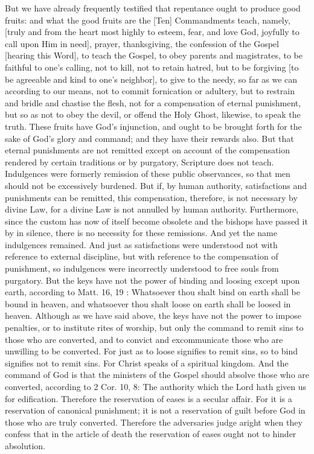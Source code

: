 But we have already frequently testified that repentance ought to
produce good fruits: and what the good fruits are the [Ten]
Commandments teach, namely, [truly and from the heart most highly to
esteem, fear, and love God, joyfully to call upon Him in need],
prayer, thanksgiving, the confession of the Gospel [hearing this
Word], to teach the Gospel, to obey parents and magistrates, to be
faithful to one's calling, not to kill, not to retain hatred, but to
be forgiving [to be agreeable and kind to one's neighbor], to give to
the needy, so far as we can according to our means, not to commit
fornication or adultery, but to restrain and bridle and chastise the
flesh, not for a compensation of eternal punishment, but so as not to
obey the devil, or offend the Holy Ghost, likewise, to speak the
truth.  These fruits have God's injunction, and ought to be brought
forth for the sake of God's glory and command; and they have their
rewards also.  But that eternal punishments are not remitted except
on account of the compensation rendered by certain traditions or by
purgatory, Scripture does not teach.  Indulgences were formerly
remission of these public observances, so that men should not be
excessively burdened.  But if, by human authority, satisfactions and
punishments can be remitted, this compensation, therefore, is not
necessary by divine Law, for a divine Law is not annulled by human
authority.  Furthermore, since the custom has now of itself become
obsolete and the bishops have passed it by in silence, there is no
necessity for these remissions.  And yet the name indulgences
remained.  And just as satisfactions were understood not with
reference to external discipline, but with reference to the
compensation of punishment, so indulgences were incorrectly
understood to free souls from purgatory.  But the keys have not the
power of binding and loosing except upon earth, according to Matt. 16,
19 : Whatsoever thou shalt bind on earth shall be bound in heaven,
and whatsoever thou shalt loose on earth shall be loosed in heaven.
Although as we have said above, the keys have not the power to impose
penalties, or to institute rites of worship, but only the command to
remit sins to those who are converted, and to convict and
excommunicate those who are unwilling to be converted.  For just as
to loose signifies to remit sins, so to bind signifies not to remit
sins.  For Christ speaks of a spiritual kingdom.  And the command of
God is that the ministers of the Gospel should absolve those who are
converted, according to 2 Cor. 10, 8: The authority which the Lord
hath given us for edification.  Therefore the reservation of eases is
a secular affair.  For it is a reservation of canonical punishment;
it is not a reservation of guilt before God in those who are truly
converted.  Therefore the adversaries judge aright when they confess
that in the article of death the reservation of eases ought not to
hinder absolution.

